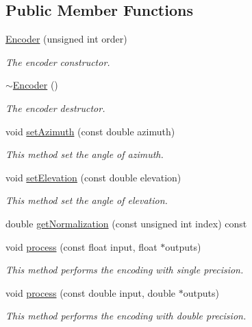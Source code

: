 \subsection*{Public Member Functions}
\begin{DoxyCompactItemize}
\item 
\hyperlink{class_hoa3_d_1_1_encoder_a71052bcb0cbcf600852423c8cbbf29ce}{Encoder} (unsigned int order)
\begin{DoxyCompactList}\small\item\em The encoder constructor. \end{DoxyCompactList}\item 
\hyperlink{class_hoa3_d_1_1_encoder_a9842ee9f5abcba58a05a98dbfdff1b15}{$\sim$\-Encoder} ()
\begin{DoxyCompactList}\small\item\em The encoder destructor. \end{DoxyCompactList}\item 
void \hyperlink{class_hoa3_d_1_1_encoder_a7dbf4d5791003ed486fc0b5462409e0a}{set\-Azimuth} (const double azimuth)
\begin{DoxyCompactList}\small\item\em This method set the angle of azimuth. \end{DoxyCompactList}\item 
void \hyperlink{class_hoa3_d_1_1_encoder_a3bf01c6ecd90108c66c19ce7e5bde97d}{set\-Elevation} (const double elevation)
\begin{DoxyCompactList}\small\item\em This method set the angle of elevation. \end{DoxyCompactList}\item 
double \hyperlink{class_hoa3_d_1_1_encoder_a9887680a1cd725b96db8d83297922ae2}{get\-Normalization} (const unsigned int index) const 
\item 
void \hyperlink{class_hoa3_d_1_1_encoder_aedcd6cc5a50c85f373c61137e452a9b4}{process} (const float input, float $\ast$outputs)
\begin{DoxyCompactList}\small\item\em This method performs the encoding with single precision. \end{DoxyCompactList}\item 
void \hyperlink{class_hoa3_d_1_1_encoder_a6a8a7c7219424dd74bb5180a5b2c25e3}{process} (const double input, double $\ast$outputs)
\begin{DoxyCompactList}\small\item\em This method performs the encoding with double precision. \end{DoxyCompactList}\end{DoxyCompactItemize}


